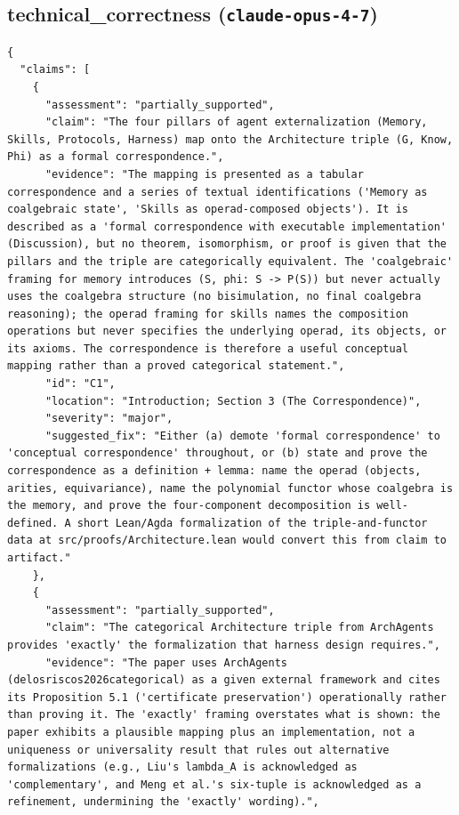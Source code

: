 \documentclass[11pt]{article}
\begin{document}
\subsection*{technical_correctness (\texttt{claude-opus-4-7})}
\begin{verbatim}
{
  "claims": [
    {
      "assessment": "partially_supported",
      "claim": "The four pillars of agent externalization (Memory, Skills, Protocols, Harness) map onto the Architecture triple (G, Know, Phi) as a formal correspondence.",
      "evidence": "The mapping is presented as a tabular correspondence and a series of textual identifications ('Memory as coalgebraic state', 'Skills as operad-composed objects'). It is described as a 'formal correspondence with executable implementation' (Discussion), but no theorem, isomorphism, or proof is given that the pillars and the triple are categorically equivalent. The 'coalgebraic' framing for memory introduces (S, phi: S -> P(S)) but never actually uses the coalgebra structure (no bisimulation, no final coalgebra reasoning); the operad framing for skills names the composition operations but never specifies the underlying operad, its objects, or its axioms. The correspondence is therefore a useful conceptual mapping rather than a proved categorical statement.",
      "id": "C1",
      "location": "Introduction; Section 3 (The Correspondence)",
      "severity": "major",
      "suggested_fix": "Either (a) demote 'formal correspondence' to 'conceptual correspondence' throughout, or (b) state and prove the correspondence as a definition + lemma: name the operad (objects, arities, equivariance), name the polynomial functor whose coalgebra is the memory, and prove the four-component decomposition is well-defined. A short Lean/Agda formalization of the triple-and-functor data at src/proofs/Architecture.lean would convert this from claim to artifact."
    },
    {
      "assessment": "partially_supported",
      "claim": "The categorical Architecture triple from ArchAgents provides 'exactly' the formalization that harness design requires.",
      "evidence": "The paper uses ArchAgents (delosriscos2026categorical) as a given external framework and cites its Proposition 5.1 ('certificate preservation') operationally rather than proving it. The 'exactly' framing overstates what is shown: the paper exhibits a plausible mapping plus an implementation, not a uniqueness or universality result that rules out alternative formalizations (e.g., Liu's lambda_A is acknowledged as 'complementary', and Meng et al.'s six-tuple is acknowledged as a refinement, undermining the 'exactly' wording).",

\end{verbatim}
\end{document}
